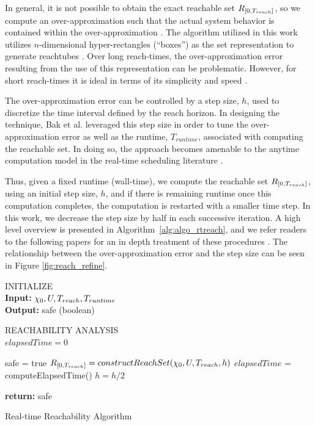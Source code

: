 \documentclass[manuscript,screen,review]{acmart}
\begin{document}
In general, it is not possible to obtain the exact reachable set $\mathnormal{R}_{[0,T_{reach}]}$, so we compute an over-approximation such that the actual system behavior is contained within the over-approximation \cite{Lin2020}. The algorithm utilized in this work utilizes $n$-dimensional hyper-rectangles (``boxes'') as the set representation to generate reachtubes \cite{Johnson2016}. Over long reach-times, the over-approximation error resulting from the use of this representation can be problematic. However, for short reach-times it is ideal in terms of its simplicity and speed \cite{Bak2014}.


The over-approximation error can be controlled by a step size, $h$, used to discretize the time interval defined by the reach horizon. In designing the technique, Bak et al. leveraged this step size in order to tune the over-approximation error as well as the runtime, $T_{runtime}$, associated with computing the reachable set. In doing so, the approach becomes amenable to the anytime computation model in the real-time scheduling literature \cite{Liu1991}.


Thus, given a fixed runtime (wall-time), we compute the reachable set $\mathnormal{R}_{[0,T_{reach}]}$, using an initial step size, $h$, and if there is remaining runtime once this computation completes, the computation is restarted with a smaller time step. In this work, we decrease the step size by half in each successive iteration. A high level overview is presented in Algorithm~\ref{alg:algo_rtreach}, and we refer readers to the following papers for an in depth treatment of these procedures \cite{dang2000,Bak2014,Johnson2016}. The relationship between the over-approximation error and the step size can be seen in Figure \ref{fig:reach_refine}.




\begin{algorithm}[]%
\DontPrintSemicolon 
INITIALIZE{
\\
\textbf{Input:} $\chi_0,\mathnormal{U},T_{reach}, T_{runtime}$ \\
\textbf{Output:} safe (boolean)
}

\vspace{2mm}

REACHABILITY ANALYSIS\\
$elapsedTime = 0$\;
 {
    safe = true\;
    $\mathnormal{R}_{[0,T_{reach}]}= constructReachSet(\chi_0,\mathnormal{U},T_{reach},h)$\;
    $elapsedTime$ = computeElapsedTime()\;
    $h = h /2$\;
    
    
    
}
\textbf{return:} safe
\caption{Real-time Reachability Algorithm}
\label{alg:algo_rtreach}
\end{algorithm}%
\end{document}
